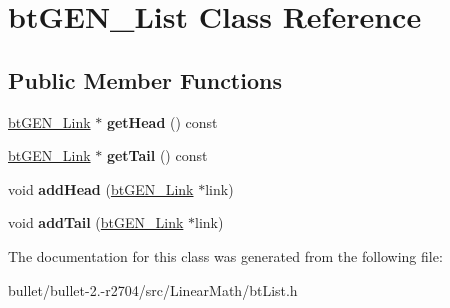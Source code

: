 \hypertarget{classbt_g_e_n___list}{\section{bt\+G\+E\+N\+\_\+\+List Class Reference}
\label{classbt_g_e_n___list}
}
\subsection*{Public Member Functions}
\begin{DoxyCompactItemize}
\item 
\hypertarget{classbt_g_e_n___list_a64c7fd4a8bf40916487dcc7b0ec26101}{\hyperlink{classbt_g_e_n___link}{bt\+G\+E\+N\+\_\+\+Link} $\ast$ {\bfseries get\+Head} () const }\label{classbt_g_e_n___list_a64c7fd4a8bf40916487dcc7b0ec26101}

\item 
\hypertarget{classbt_g_e_n___list_aac03fffd5e0dce627a658dc21f527434}{\hyperlink{classbt_g_e_n___link}{bt\+G\+E\+N\+\_\+\+Link} $\ast$ {\bfseries get\+Tail} () const }\label{classbt_g_e_n___list_aac03fffd5e0dce627a658dc21f527434}

\item 
\hypertarget{classbt_g_e_n___list_a5f2e37ec52ee6ba0ad73d98ff399fc8c}{void {\bfseries add\+Head} (\hyperlink{classbt_g_e_n___link}{bt\+G\+E\+N\+\_\+\+Link} $\ast$link)}\label{classbt_g_e_n___list_a5f2e37ec52ee6ba0ad73d98ff399fc8c}

\item 
\hypertarget{classbt_g_e_n___list_ae629b465f074aec6212e1aec66e9e555}{void {\bfseries add\+Tail} (\hyperlink{classbt_g_e_n___link}{bt\+G\+E\+N\+\_\+\+Link} $\ast$link)}\label{classbt_g_e_n___list_ae629b465f074aec6212e1aec66e9e555}

\end{DoxyCompactItemize}


The documentation for this class was generated from the following file\+:\begin{DoxyCompactItemize}
\item 
bullet/bullet-\/2.-\/r2704/src/\+Linear\+Math/bt\+List.\+h\end{DoxyCompactItemize}

